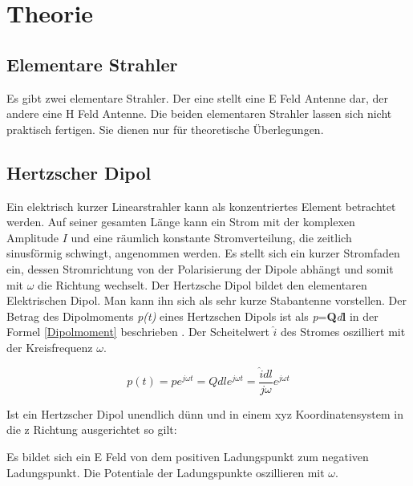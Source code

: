 \newpage
\section{Theorie}
\subsection{Elementare Strahler}
Es gibt zwei elementare Strahler. Der eine stellt eine E Feld Antenne dar, der andere eine H Feld Antenne. Die beiden elementaren Strahler lassen sich nicht praktisch fertigen. Sie dienen nur für theoretische Überlegungen. 
\subsection{Hertzscher Dipol }
Ein elektrisch kurzer Linearstrahler kann als konzentriertes Element betrachtet werden. Auf seiner gesamten Länge kann ein Strom mit der komplexen Amplitude $I$ und eine räumlich konstante Stromverteilung, die zeitlich sinusförmig schwingt, angenommen werden. Es stellt sich ein kurzer Stromfaden ein, dessen Stromrichtung von der Polarisierung der Dipole abhängt und somit mit $\omega $ die Richtung wechselt. 
Der Hertzsche Dipol bildet den elementaren Elektrischen Dipol. Man kann ihn sich als sehr kurze Stabantenne vorstellen. Der Betrag des Dipolmoments \textit{p(t)} eines Hertzschen Dipols ist als \textit{p}=\textbf{Q}\textit{d}\textbf{\textbf{l}} in der Formel \ref{Dipolmoment} beschrieben \cite{Emant}. Der Scheitelwert $\hat{i}$ des Stromes  oszilliert mit der Kreisfrequenz  $\omega$.

\begin{equation}\label{Dipolmoment}
p(t)=pe^{j\omega t} = Q dl e^{j\omega t} = \frac{\hat{i} dl}{j\omega }e^{j\omega t}
\end{equation}

Ist ein Hertzscher Dipol unendlich dünn und in einem xyz Koordinatensystem in die z Richtung ausgerichtet so gilt:
 
Es bildet sich ein E Feld von dem positiven Ladungspunkt zum negativen Ladungspunkt. Die Potentiale der Ladungspunkte oszillieren mit $\omega$. 

